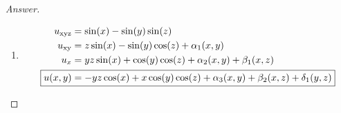 \documentclass{article}
\theoremstyle{definition}
\renewcommand\qedsymbol{$\blacksquare$}
\newenvironment{ans}{\begin{proof}[Answer]\renewcommand{\qedsymbol}{}}{\end{proof}}
\begin{document}
\begin{ans}
\begin{enumerate}[resume*=answers]
				\item \begin{align*}
					u_{\mathrm{xyz}} &= \sin(x)-\sin(y)\sin(z)
					\\ u_{\mathrm{xy}} &= z\sin(x) - \sin(y)\cos(z) + \alpha_1(x, y)
					\\ u_x &=  yz\sin(x) + \cos(y)\cos(z) + \alpha_2(x, y) + \beta_1(x,z)
					\\ \Aboxed{u(x,y) &= -yz\cos(x) + x\cos(y)\cos(z) + \alpha_3(x, y) + \beta_2(x,z) +\delta_1(y,z)}
				\end{align*}
			\end{enumerate}
		\end{ans}
		
	
\end{document}
